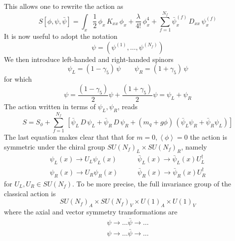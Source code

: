 This allows one to rewrite the action as
\begin{equation*}
    S[\phi,\psi,\bar\psi] = \int_x \frac{1}{2} \, \phi_x \, K_{xx} \, \phi_x + \frac{\lambda}{4!} \, \phi_x^4 + \sum_{f=1}^{N_f} \bar\psi_x^{(f)} \, D_{xx} \, \psi_x^{(f)}
\end{equation*}
It is now useful to adopt the notation 
\begin{equation*}
    \psi = (\psi^{(1)}, \dots, \psi^{(N_f)})
\end{equation*} 
We then introduce left-handed and right-handed spinors
\begin{equation*}
	\psi_L = (1-\gamma_5) \, \psi \qquad \psi_R = (1+\gamma_5) \, \psi
\end{equation*}
for which
\begin{equation*}
	\psi = \frac{(1-\gamma_5)}{2} \psi + \frac{(1+\gamma_5)}{2} \psi = \psi_L + \psi_R
\end{equation*}
The action written in terms of $\psi_L, \psi_R$, reads
\begin{equation}
	S = S_\phi +  \sum_{f=1}^{N_f} \, \left[\bar\psi_L \, D \, \psi_L + \bar\psi_R \, D \, \psi_R + (m_q + g\phi) \,  \left(\bar\psi_L\psi_R + \bar\psi_R\psi_L\right)\right]
	\label{eq:action_chirality_explicit}
\end{equation}
The last equation makes clear that that for $m=0,\left\langle\phi\right\rangle = 0$ the action is symmetric under the chiral group $SU(N_f) _L\times SU(N_f)_R$, namely
\begin{equation*}
	\begin{aligned}
		\psi_L(x) \to U_L\psi_L(x) &\qquad \bar\psi_L(x) \to \bar\psi_L(x) U_L^{\dagger} \\
		\psi_R(x) \to U_R\psi_R(x) &\qquad \bar\psi_R(x) \to \bar\psi_R(x) U_R^{\dagger}
	\end{aligned}
\end{equation*}
for $U_L, U_R \in SU(N_f)$. To be more precise, the full invariance group of the classical action is 
\begin{equation*}
    SU(N_f)_A \times SU(N_f)_V \times U(1)_A \times U(1)_V
\end{equation*}
where the axial and vector symmetry transformations are
\begin{equation*}
    \begin{aligned}
        \psi \to \dots \bar\psi \to \dots \\
        \psi \to \dots \bar\psi \to \dots
    \end{aligned}
\end{equation*} 
